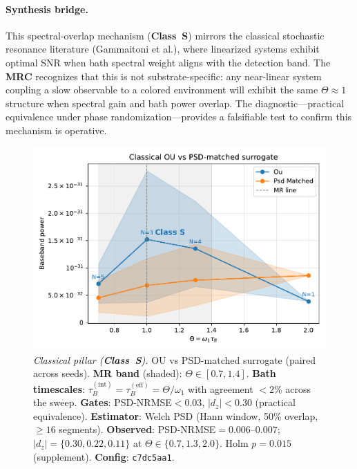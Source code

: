 \documentclass[11pt,letterpaper]{article}
\newcommand{\confighash}{c7dc5aa1}
\DeclareRobustCommand{\mrc}{\textbf{MRC}\xspace}
\DeclareRobustCommand{\classS}{\textbf{Class~S}\xspace}
\begin{document}
\paragraph*{Synthesis bridge.} This spectral-overlap mechanism (\classS) mirrors the classical stochastic resonance literature (Gammaitoni et al.), where linearized systems exhibit optimal SNR when bath spectral weight aligns with the detection band. The \mrc recognizes that this is not substrate-specific: any near-linear system coupling a slow observable to a colored environment will exhibit the same $\Theta\!\approx\!1$ structure when spectral gain and bath power overlap. The diagnostic---practical equivalence under phase randomization---provides a falsifiable test to confirm this mechanism is operative.

\begin{figure}[t]
\centering
\includegraphics[width=0.8\linewidth]{figA_classical.pdf}
\caption{\emph{Classical pillar (\classS).} OU vs PSD-matched surrogate (paired across seeds). \textbf{MR band} (shaded): $\Theta\in[0.7,1.4]$. \textbf{Bath timescales}: $\tau_B^{(\mathrm{int})}=\tau_B^{(\mathrm{eff})}=\Theta/\omega_1$ with agreement $<2\%$ across the sweep. \textbf{Gates}: PSD-NRMSE$<0.03$, $|d_z|<0.30$ (practical equivalence). \textbf{Estimator}: Welch PSD (Hann window, 50\% overlap, $\ge\!16$ segments). \textbf{Observed}: PSD-NRMSE$=0.006$--$0.007$; $|d_z|=\{0.30,0.22,0.11\}$ at $\Theta\in\{0.7,1.3,2.0\}$. Holm $p=0.015$ (supplement). \textbf{Config}: \texttt{\confighash}.}
\end{figure}
\end{document}
